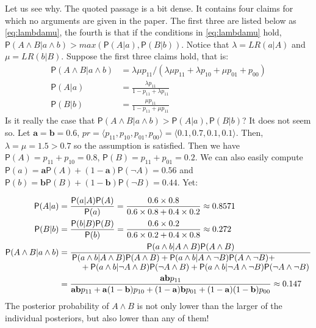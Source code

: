 \documentclass[
  10pt,
  dvipsnames,enabledeprecatedfontcommands]{scrartcl}
\newcommand{\ra}{\rangle}
\newcommand{\la}{\langle}
\newcommand{\n}{\neg}
\newcommand{\et}{\wedge}
\newcommand{\pr}[1]{\mathsf{P}(#1)}
\begin{document}
Let us see why. The quoted passage is a bit dense. It contains four
claims for which no arguments are given in the paper. The first three
are listed below as \eqref{eq:lambdamu}, the fourth is that if the
conditions in \eqref{eq:lambdamu} hold,
\(\pr{A\et B\vert a\et b}>max(\pr{A\vert a},\pr{B\vert b})\). Notice
that \(\lambda=LR(a\vert A)\) and \(\mu=LR(b\vert B)\). Suppose the
first three claims hold, that is: \begin{align}\label{eq:lambdamu}
 \pr{A\et B\vert  a\et b} &= \lambda \mu p_{11}/(\lambda \mu p_{11} + \lambda p_{10} +\mu p_{01} + p_{00})\\
 \pr{A\vert a} & = \frac{\lambda p_{11}}{1-p_{11}+\lambda p_{11}}\nonumber \\
 \pr{B\vert b} & = \frac{\mu p_{11}}{1-p_{11}+\mu p_{11}} \nonumber 
 \end{align} \noindent Is it really the case that
\(\pr{A\et B\vert a\et b}>\pr{A\vert a},\pr{B\vert b}\)? It does not
seem so. Let \(\mathbf{a}=\mathbf{b}=0.6\),
\(pr =\la p_{11},p_{10},p_{01},p_{00}\ra=\la 0.1, 0.7, 0.1, 0.1 \ra\).
Then, \(\lambda=\mu=1.5>0.7\) so the assumption is satisfied. Then we
have \(\pr{A}=p_{11}+p_{10}=0.8\), \(\pr{B}=p_{11}+p_{01}=0.2\). We can
also easily compute
\(\pr{a}=\mathbf{a}\pr{A}+(1-\mathbf{a})\pr{\n A}=0.56\) and
\(\pr{b}=\mathbf{b}\pr{B}+(1-\mathbf{b})\pr{\n B}=0.44\). Yet:

\begin{align*}
 \pr{A\vert a} & = \frac{\pr{a\vert A}\pr{A}}{\pr{a}} = \frac{0.6\times 0.8}{0.6\times 0.8 + 0.4\times 0.2}\approx 0.8571 \\
 \pr{B\vert b} & = \frac{\pr{b\vert B}\pr{B}}{\pr{b}} = \frac{0.6\times 0.2}{0.6\times 0.2 + 0.4\times 0.8}\approx 0.272 \\
 \pr{A\et B \vert a \et b} & = \frac{\pr{a\et b\vert A \et B}\pr{A\et B}}{\splitfrac{\pr{a\et b \vert A\et B}\pr{A\et B}+
   \pr{a\et b\vert A\et \n B}\pr{A\et \n B} +}{+ 
 \pr{a\et b \vert \n A \et B}\pr{\n A \et B} + \pr{a\et b \vert \n A \et \n B}\pr{\n A \et \n B}}} \\
 & = \frac{\mathbf{ab}p_{11}}{
   \mathbf{ab}p_{11} + \mathbf{a}(1-\mathbf{b})p_{10} + (1-\mathbf{a})\mathbf{b}p_{01} + (1-\mathbf{a})(1-\mathbf{b})p_{00}
 }  
    \approx 0.147
 \end{align*} The posterior probability of \(A\et B\) is not only lower
than the larger of the individual posteriors, but also lower than any of
them!
\end{document}
